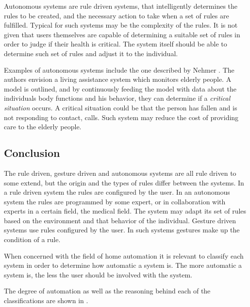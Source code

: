 Autonomous systems are rule driven systems, 
that intelligently determines the rules to be created, 
and the necessary action to take when a set of rules are fulfilled. 
Typical for such systems may be the complexity of the rules. 
It is not given that users themselves are capable of determining a suitable set of rules in order to judge if their health is critical. 
The system itself should be able to determine such set of rules and adjust it to the individual.

Examples of autonomous systems include the one described by Nehmer \etal \cite{nehmer2006living}. 
The authors envision a living assistance system which monitors elderly people. 
A model is outlined, 
and by continuously feeding the model with data about the individuals body functions and his behavior, 
they can determine if a \emph{critical situation} occurs. 
A critical situation could be that the person has fallen and is not responding to contact, \eg calls.
Such system may reduce the cost of providing care to the elderly people.

\subsection{Conclusion}

The rule driven, gesture driven and autonomous systems are all rule driven to some extend, 
but the origin and the types of rules differ between the systems. 
In a rule driven system the rules are configured by the user.
In an autonomous system the rules are programmed by some expert, 
or in collaboration with experts in a certain field, \eg the medical field. 
The system may adapt its set of rules based on the environment and that behavior of the individual.
Gesture driven systems use rules configured by the user. 
In such systems gestures make up the condition of a rule.

When concerned with the field of home automation it is relevant to classify each system in order to determine how automatic a system is. 
The more automatic a system is, the less the user should be involved with the system.

The degree of automation as well as the reasoning behind each of the classifications are shown in .

